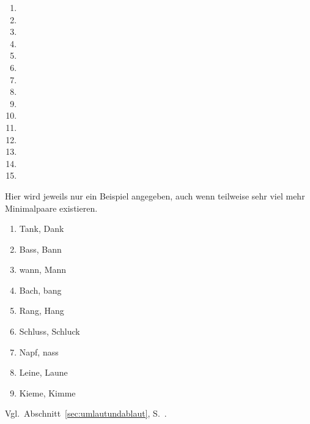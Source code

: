 \label{sol:phonetik03}

\begin{enumerate}
  \item {} 
  \item \textipa{[ni:z@n]}
  \item \textipa{[vIs@n]}
  \item {}
  \item \textipa{[defini\t{ts}Jo:n]}
  \item \textipa{[f5P\t{aE}nsh\t{aO}s]}
  \item \textipa{[kl\t{aE}nI\c{c}k\t{aE}t]}
  \item \textipa{[za:n@t\t{O@}t@]}
  \item \textipa{[hu:st@nzaft]}
  \item \textipa{[Po:n@]}
  \item \textipa{[b@StImUN]}
  \item \textipa{[tu:X]}
  \item \textipa{[SUps@n]}
  \item \textipa{[b\t{E@}\c{c}@n]}
  \item {}
\end{enumerate}


\label{sol:phonologie01}

Hier wird jeweils nur ein Beispiel angegeben, auch wenn teilweise sehr viel mehr Minimalpaare existieren.

\begin{enumerate}
  \item Tank, Dank
  \item Bass, Bann
  \item wann, Mann
  \item Bach, bang
  \item Rang, Hang
  \item Schluss, Schluck
  \item Napf, nass
  \item Leine, Laune
  \item Kieme, Kimme
\end{enumerate}

\label{sol:phonologie02}

Vgl.\ Abschnitt~\ref{sec:umlautundablaut}, S.~\pageref{sec:umlautundablaut}.

\label{sol:phonologie03}

